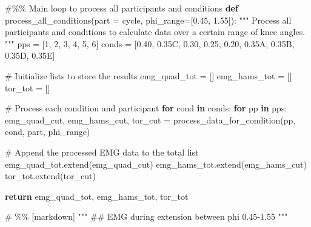 \documentclass[
  11pt,
  a4paper]{article}
\newenvironment{Shaded}{\begin{snugshade}}{\end{snugshade}}
\newcommand{\CommentTok}[1]{\textcolor[rgb]{0.37,0.37,0.37}{#1}}
\newcommand{\ControlFlowTok}[1]{\textcolor[rgb]{0.00,0.23,0.31}{\textbf{#1}}}
\newcommand{\DecValTok}[1]{\textcolor[rgb]{0.68,0.00,0.00}{#1}}
\newcommand{\FloatTok}[1]{\textcolor[rgb]{0.68,0.00,0.00}{#1}}
\newcommand{\KeywordTok}[1]{\textcolor[rgb]{0.00,0.23,0.31}{\textbf{#1}}}
\newcommand{\NormalTok}[1]{\textcolor[rgb]{0.00,0.23,0.31}{#1}}
\newcommand{\OperatorTok}[1]{\textcolor[rgb]{0.37,0.37,0.37}{#1}}
\newcommand{\StringTok}[1]{\textcolor[rgb]{0.13,0.47,0.30}{#1}}
\begin{document}
\begin{Shaded}
\begin{Highlighting}[]
\CommentTok{\#\%\% Main loop to process all participants and conditions}
\KeywordTok{def}\NormalTok{ process\_all\_conditions(part }\OperatorTok{=} \StringTok{\textquotesingle{}cycle\textquotesingle{}}\NormalTok{, phi\_range}\OperatorTok{=}\NormalTok{[}\FloatTok{0.45}\NormalTok{, }\FloatTok{1.55}\NormalTok{]):}
    \CommentTok{"""}
\CommentTok{    Process all participants and conditions to calculate data over a certain range of knee angles.}
\CommentTok{    """}
\NormalTok{    pps }\OperatorTok{=}\NormalTok{ [}\DecValTok{1}\NormalTok{, }\DecValTok{2}\NormalTok{, }\DecValTok{3}\NormalTok{, }\DecValTok{4}\NormalTok{, }\DecValTok{5}\NormalTok{, }\DecValTok{6}\NormalTok{]}
\NormalTok{    conds }\OperatorTok{=}\NormalTok{ [}\StringTok{\textquotesingle{}0.40\textquotesingle{}}\NormalTok{, }\StringTok{\textquotesingle{}0.35C\textquotesingle{}}\NormalTok{, }\StringTok{\textquotesingle{}0.30\textquotesingle{}}\NormalTok{, }\StringTok{\textquotesingle{}0.25\textquotesingle{}}\NormalTok{, }\StringTok{\textquotesingle{}0.20\textquotesingle{}}\NormalTok{, }\StringTok{\textquotesingle{}0.35A\textquotesingle{}}\NormalTok{, }\StringTok{\textquotesingle{}0.35B\textquotesingle{}}\NormalTok{, }\StringTok{\textquotesingle{}0.35D\textquotesingle{}}\NormalTok{, }\StringTok{\textquotesingle{}0.35E\textquotesingle{}}\NormalTok{]}
    
    \CommentTok{\# Initialize lists to store the results}
\NormalTok{    emg\_quad\_tot }\OperatorTok{=}\NormalTok{ []}
\NormalTok{    emg\_hams\_tot }\OperatorTok{=}\NormalTok{ []}
\NormalTok{    tor\_tot }\OperatorTok{=}\NormalTok{ []}
    
    \CommentTok{\# Process each condition and participant}
    \ControlFlowTok{for}\NormalTok{ cond }\KeywordTok{in}\NormalTok{ conds:}
        \ControlFlowTok{for}\NormalTok{ pp }\KeywordTok{in}\NormalTok{ pps:}
\NormalTok{            emg\_quad\_cut, emg\_hams\_cut, tor\_cut }\OperatorTok{=}\NormalTok{ process\_data\_for\_condition(pp, cond, part, phi\_range)}

            \CommentTok{\# Append the processed EMG data to the total list}
\NormalTok{            emg\_quad\_tot.extend(emg\_quad\_cut)}
\NormalTok{            emg\_hams\_tot.extend(emg\_hams\_cut)}
\NormalTok{            tor\_tot.extend(tor\_cut)}
            
    \ControlFlowTok{return}\NormalTok{ emg\_quad\_tot, emg\_hams\_tot, tor\_tot}

\CommentTok{\# \%\% [markdown]}
\CommentTok{"""}
\CommentTok{\#\# EMG during extension between phi 0.45{-}1.55}
\CommentTok{"""}


\end{Highlighting}
\end{Shaded}
\end{document}
